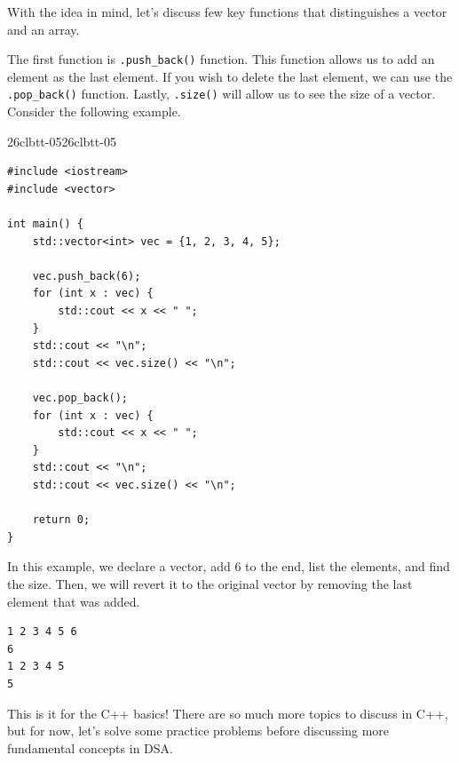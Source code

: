 \documentclass[../../../main.tex]{subfiles}
\begin{document}
With the idea in mind, let's discuss few key functions that
distinguishes a vector and an array.

The first function is \verb|.push_back()| function. This function
allows us to add an element as the last element. If you wish to
delete the last element, we can use the \verb|.pop_back()| function.
Lastly, \verb|.size()| will allow us to see the size of a vector.
Consider the following example.

\begin{cppbox}{26clbtt-05}{26clbtt-05}
\begin{lstlisting}[style=cppstyle]
#include <iostream>
#include <vector>

int main() {
    std::vector<int> vec = {1, 2, 3, 4, 5};
    
    vec.push_back(6);
    for (int x : vec) {
        std::cout << x << " ";
    }
    std::cout << "\n";
    std::cout << vec.size() << "\n";

    vec.pop_back();
    for (int x : vec) {
        std::cout << x << " ";
    }
    std::cout << "\n";
    std::cout << vec.size() << "\n";

    return 0;
}
\end{lstlisting}
\end{cppbox}

In this example, we declare a vector, add $6$ to the end, list the
elements, and find the size. Then, we will revert it to the original
vector by removing the last element that was added.

\begin{outputbox}
\begin{lstlisting}[style=basic]
1 2 3 4 5 6
6
1 2 3 4 5
5
\end{lstlisting}
\end{outputbox}

This is it for the C++ basics! There are so much more topics to
discuss in C++, but for now, let's solve some practice problems
before discussing more fundamental concepts in DSA.
\end{document}
